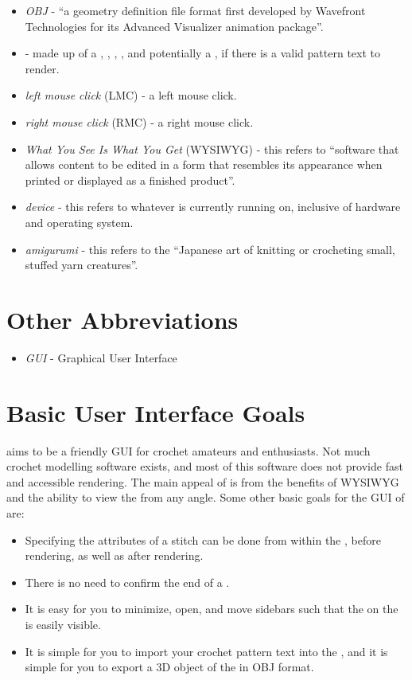 \documentclass[main.tex]{subfiles}
\begin{document}
\begin{itemize}
\item \emph{OBJ} - ``a geometry definition file format first developed by Wavefront Technologies for its Advanced Visualizer animation package''.
\item \ScLayout{} - made up of a \MenuBar, \PatSidebar, \PropSidebar, \CRW, and potentially a \RM, if there is a valid pattern text to render.
\item \emph{left mouse click} (LMC) - a left mouse click. 
\item \emph{right mouse click} (RMC) - a right mouse click.
\item \emph{What You See Is What You Get} (WYSIWYG) - this refers to ``software that allows content to be edited in a form that resembles its appearance when printed or displayed as a finished product''.
\item \emph{device} - this refers to whatever \CC{} is currently running on, inclusive of hardware and operating system.
\item \emph{amigurumi} - this refers to the ``Japanese art of knitting or crocheting small, stuffed yarn creatures''.
\end{itemize}

\section{Other Abbreviations}

\begin{itemize}
\item \emph{GUI} - Graphical User Interface
\end{itemize}

\section{Basic User Interface Goals}

\CC{} aims to be a friendly GUI for crochet amateurs and enthusiasts. Not much crochet modelling software exists, and most of this software does not provide fast and accessible rendering. The main appeal of \CC{} is from the benefits of WYSIWYG and the ability to view the \RM{} from any angle. Some other basic goals for the GUI of \CC{} are:

\begin{itemize}
\item Specifying the attributes of a stitch can be done from within the \PTI, before rendering, as well as after rendering.
\item There is no need to confirm the end of a \PTI.
\item It is easy for you to minimize, open, and move sidebars such that the \RM{} on the \CRW{} is easily visible.
\item It is simple for you to import your crochet pattern text into the \PTI, and it is simple for you to export a 3D object of the \RM{} in OBJ format.
\end{itemize}
\end{document}
